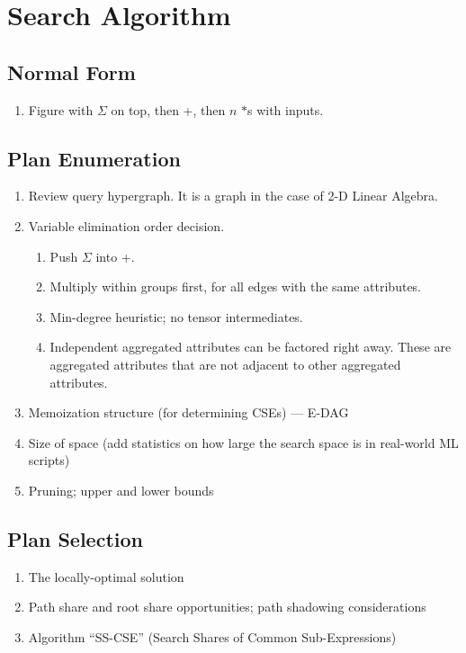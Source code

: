 \documentclass{vldb}
\begin{document}
\section{Search Algorithm}

\subsection{Normal Form}
\begin{enumerate}
\item Figure with $\Sigma$ on top, then +, then $n$ $*$s with inputs.
\end{enumerate}

\subsection{Plan Enumeration}
\begin{enumerate}
\item Review query hypergraph. It is a graph in the case of 2-D Linear Algebra.
\item Variable elimination order decision.
  \begin{enumerate}
  \item Push $\Sigma$ into +.
  \item Multiply within groups first, for all edges with the same attributes.
  \item Min-degree heuristic; no tensor intermediates.
  \item Independent aggregated attributes can be factored right away. These are aggregated attributes that are not adjacent to other aggregated attributes.
  \end{enumerate}
\item Memoization structure (for determining CSEs) --- E-DAG
\item Size of space (add statistics on how large the search space is in real-world ML scripts)
\item Pruning; upper and lower bounds
\end{enumerate}

\subsection{Plan Selection}
\begin{enumerate}
\item The locally-optimal solution
\item Path share and root share opportunities; path shadowing considerations
\item Algorithm ``SS-CSE'' (Search Shares of Common Sub-Expressions)
\end{enumerate}
\end{document}
